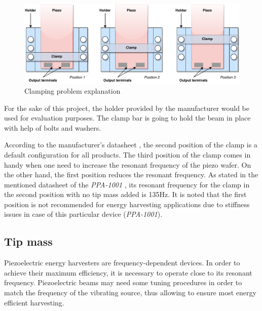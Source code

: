 \documentclass[12pt,a4paper]{article}
\begin{document}
\begin{figure}[ht!]
\includegraphics[scale=0.85]{clamping.pdf}
\caption{Clamping problem explanation}
\label{fig:clamping}
\end{figure}

For the sake of this project, the holder provided by the manufacturer would be used for evaluation purposes. The clamp bar is going to hold the beam in place with help of bolts and washers.\par
According to the manufacturer's datasheet \cite{PPA}, the second position of the clamp is a default configuration for all products. The third position of the clamp comes in handy when one need to increase the resonant frequency of the piezo wafer. On the other hand, the first position reduces the resonant frequency. As stated in the mentioned datasheet of the \textit{PPA-1001} \cite{PPA}, its resonant frequency for the clamp in the second position with no tip mass added is 135Hz. It is noted that the first position is not recommended for energy harvesting applications due to stiffness issues in case of this particular device (\textit{PPA-1001}).\par

\subsection{Tip mass}
Piezoelectric energy harvesters are frequency-dependent devices. In order to achieve their maximum efficiency, it is necessary to operate close to its resonant frequency. Piezoelectric beams may need some tuning procedures in order to match the frequency of the vibrating source, thus allowing to ensure most energy efficient harvesting.\par
\end{document}
